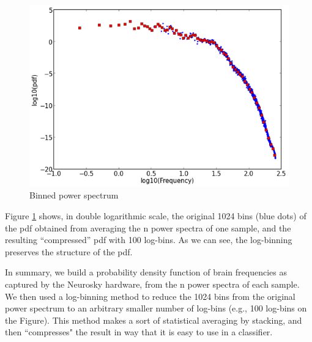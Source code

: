 
\begin{figure}
\begin{center}
\includegraphics[width=5in]{Figures/binned_EEGPowerSpectrum.png}
\caption{Binned power spectrum}
\label{binnedEEGpowerspec}
\end{center}
\end{figure}


Figure \ref{binnedEEGpowerspec} shows, in double logarithmic scale, the original 1024 bins (blue dots) of the pdf obtained from averaging the n power spectra of one sample, and the resulting ``compressed''  pdf with 100 log-bins. As we can see, the log-binning preserves the structure of the pdf.

In summary, we build a probability density function of brain frequencies as captured by the Neurosky hardware, from the n power spectra of each sample. We then used a log-binning method to reduce the 1024 bins from the original power spectrum to an arbitrary smaller number of log-bins (e.g., 100 log-bins on the Figure). This method makes a sort of statistical averaging by stacking, and then ``compresses" the result in way that it is easy to use in a classifier.

